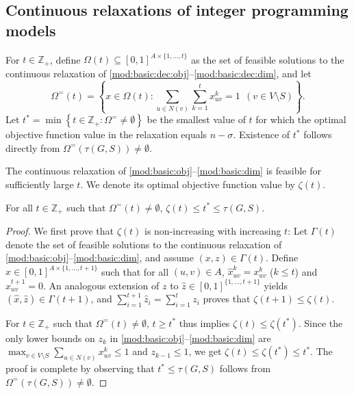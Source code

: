 \subsection{Continuous relaxations of integer programming models} \label{sec:lblprel}

For $t\in\mathbb{Z}_+$, define $\Omega(t)\subseteq[0,1]^{A\times\{1,\ldots,t\}}$ as the set of feasible solutions to the continuous relaxation of
\eqref{mod:basic:dec:obj}--\eqref{mod:basic:dec:dim},
and let
\[
 \Omega^=(t) = \left\{x\in\Omega(t): \sum\limits_{u \in N(v)} \sum\limits_{k=1}^tx_{uv}^k = 1 ~~(v\in V\setminus S)\right\}.
\]
Let $t^{\ast}=\min\left\{t\in\mathbb{Z}_+: \Omega^=\neq\emptyset\right\}$ be the smallest value of $t$ for which the optimal objective function value in
the relaxation equals $n-\sigma$.
Existence of $t^{\ast}$ follows directly from $\Omega^=\left(\tau(G,S)\right)\neq\emptyset$.

The continuous relaxation of \eqref{mod:basic:obj}--\eqref{mod:basic:dim} is feasible for sufficiently large $t$.
We denote its optimal objective function value by $\zeta(t)$.

\begin{proposition} \label{prop:lpweak}
For all $t\in\mathbb{Z}_+$ such that $\Omega^=(t)\neq\emptyset$, $\zeta(t)\leq t^{\ast}\leq\tau(G,S)$.
\end{proposition}
\begin{proof}
We first prove that $\zeta(t)$ is non-increasing with increasing $t$:
Let $\Gamma(t)$ denote the set of feasible solutions to the continuous relaxation of \eqref{mod:basic:obj}--\eqref{mod:basic:dim}, and assume $(x,z)\in\Gamma(t)$.
Define $\hat{x}\in[0,1]^{A\times\{1,\ldots,t+1\}}$ such that
for all $(u,v)\in A$, $\hat{x}_{uv}^k=x_{uv}^k$ ($k\leq t$) and $\hat{x}_{uv}^{t+1}=0$.
An analogous extension of $z$ to $\hat{z}\in[0,1]^{\{1,\ldots,t+1\}}$ yields $(\hat{x},\hat{z})\in\Gamma(t+1)$,
and $\sum_{i=1}^{t+1}\hat{z}_i=\sum_{i=1}^tz_i$ proves that $\zeta(t+1)\leq\zeta(t)$.

For $t\in\mathbb{Z}_+$ such that $\Omega^=(t)\neq\emptyset$, $t\geq t^{\ast}$ thus implies $\zeta(t)\leq\zeta(t^{\ast})$.
Since the only lower bounds on $z_k$ in \eqref{mod:basic:obj}--\eqref{mod:basic:dim} are $\max_{v\in V\setminus S}\sum\limits_{u \in N(v)}x_{uv}^k\leq 1$ and $z_{k-1}\leq 1$,
we get $\zeta(t)\leq\zeta(t^{\ast})\leq t^{\ast}$.
The proof is complete by observing that $t^{\ast}\leq\tau(G,S)$ follows from $\Omega^=\left(\tau(G,S)\right)\neq\emptyset$.
\end{proof}

